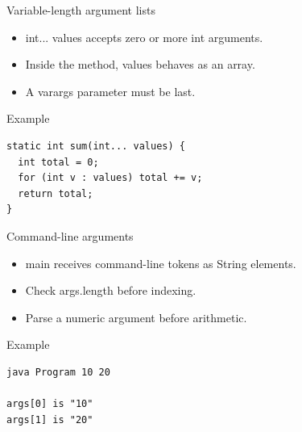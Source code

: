 \documentclass[10pt,aspectratio=169]{beamer}
\begin{document}
\begin{frame}[fragile,t]{Variable-length argument lists}
\begin{itemize}
\item int... values accepts zero or more int arguments.
\item Inside the method, values behaves as an array.
\item A varargs parameter must be last.
\end{itemize}
\vspace{1mm}\begin{block}{Example}
\begin{lstlisting}
static int sum(int... values) {
  int total = 0;
  for (int v : values) total += v;
  return total;
}
\end{lstlisting}
\end{block}
\end{frame}

\begin{frame}[fragile,t]{Command-line arguments}
\begin{itemize}
\item main receives command-line tokens as String elements.
\item Check args.length before indexing.
\item Parse a numeric argument before arithmetic.
\end{itemize}
\vspace{1mm}\begin{block}{Example}
\begin{lstlisting}
java Program 10 20

args[0] is "10"
args[1] is "20"
\end{lstlisting}
\end{block}
\end{frame}
\end{document}
